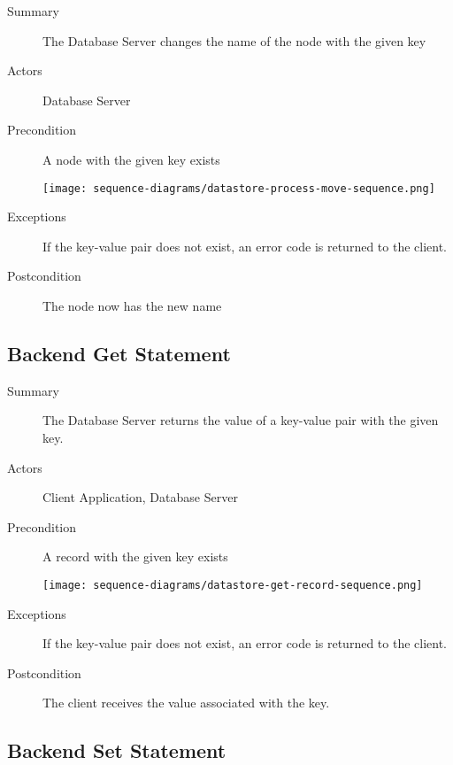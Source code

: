 \documentclass[a4paper]{report}
\begin{document}
	\begin{description}
		\item[Summary] The Database Server changes the name of the node with the given key
		\item[Actors] Database Server
		\item[Precondition] A node with the given key exists

		\begin{center}
			\texttt{[image: sequence-diagrams/datastore-process-move-sequence.png]}
		\end{center}

		\item[Exceptions] If the key-value pair does not exist, an error code is returned to the client.
		\item[Postcondition] The node now has the new name
	\end{description}

	\pagebreak
	
	\subsection{Backend Get Statement}

	\begin{description}
		\item[Summary] The Database Server returns the value of a key-value pair with the given key.
		\item[Actors] Client Application, Database Server
		\item[Precondition] A record with the given key exists

		\begin{center}
			\texttt{[image: sequence-diagrams/datastore-get-record-sequence.png]}
		\end{center}

		\item[Exceptions] If the key-value pair does not exist, an error code is returned to the client.
		\item[Postcondition] The client receives the value associated with the key.
	\end{description}

	\pagebreak
	
	\subsection{Backend Set Statement}
\end{document}
